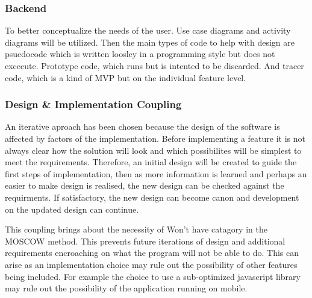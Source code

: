     \subsubsection{Backend}
      To better conceptualize the needs of the user. Use case diagrams and activity diagrams will be utilized. Then the main types of code to help with design are psuedocode which is written loosley in a programming style but does not excecute. Prototype code, which runs but is intented to be discarded. And tracer code, which is a kind of MVP but on the individual feature level.
    \subsubsection{Design \& Implementation Coupling}
      An iterative aproach has been chosen because the design of the software is affected by factors of the implementation. Before implementing a feature it is not always clear how the solution will look and which possibilites will be simplest to meet the requirements. Therefore, an initial design will be created to guide the first steps of implementation, then as more information is learned and perhaps an easier to make design is realised, the new design can be checked against the requirments. If satisfactory, the new design can become canon and development on the updated design can continue.
      \par
      This coupling brings about the necessity of Won't have catagory in the MOSCOW method. This prevents future iterations of design and additional requirements encroaching on what the program will not be able to do. This can arise as an implementation choice may rule out the possibility of other features being included. For example the choice to use a sub-optimized javascript library may rule out the possibility of the application running on mobile.

